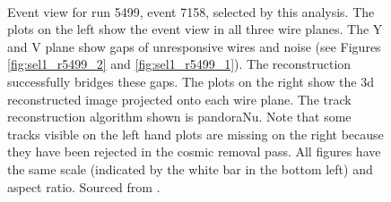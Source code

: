 \begin{figure}[htbp]
\begin{adjustwidth}{-1cm}{-1cm}
 \\   
\caption[Event View for Run 5499, Event 7158]{Event view for run 5499, event 7158, selected by this analysis. The plots on the left show the event view in all three wire planes. The Y and V plane show gaps of unresponsive wires and noise (see Figures \ref{fig:sel1_r5499_2} and \ref{fig:sel1_r5499_1}). The reconstruction successfully bridges these gaps. The plots on the right show the \gls{3d} reconstructed image projected onto each wire plane. The track reconstruction algorithm shown is pandoraNu. Note that some tracks visible on the left hand plots are missing on the right because they have been rejected in the cosmic removal pass. All figures have the same scale (indicated by the white bar in the bottom left) and aspect ratio. Sourced from \cite{MicroBooNECCInclPN}.}
\label{fig:sel1_r5499}
\end{adjustwidth}
\end{figure}


